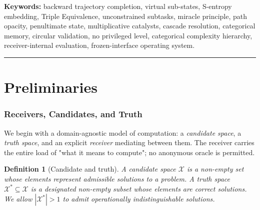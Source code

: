 \documentclass[twocolumn,a4paper]{article}
\newtheorem{definition}[theorem]{Definition}
\newcommand{\Cands}{\mathcal{X}}
\newcommand{\Truth}{\mathcal{X}^{*}}
\begin{document}
\begin{abstract}
closed-form mathematical specification, each forced by a separate theorem and not by design choice. The full architecture admits a frozen-interface contract under which the central abstractions (a vaHera AST, a Resolver trait, a Provider trait, an Operation registry) satisfy stability invariants derivable from the no-privileged-level structure. The mathematical content is presented as pure computer science: every claim is proven, every construction is finite, every algorithm has a complexity proof, every theorem has a numerical validation. A complete validation suite of fourteen experiments, each persisted as a JSON record, verifies the principal theorems with maximum identity-discrepancy below $10^{-10}$ and predicted scaling laws confirmed across grids spanning four orders of magnitude in problem size.
\end{abstract}

\noindent\textbf{Keywords:} backward trajectory completion, virtual sub-states, S-entropy embedding, Triple Equivalence, unconstrained subtasks, miracle principle, path opacity, penultimate state, multiplicative catalysts, cascade resolution, categorical memory, circular validation, no privileged level, categorical complexity hierarchy, receiver-internal evaluation, frozen-interface operating system.

\tableofcontents

\vspace{6pt}
\hrule
\vspace{6pt}

\part{Preliminaries}

\section{Receivers, Candidates, and Truth}
\label{sec:receivers}

We begin with a domain-agnostic model of computation: a \emph{candidate space}, a \emph{truth space}, and an explicit \emph{receiver} mediating between them. The receiver carries the entire load of "what it means to compute"; no anonymous oracle is permitted.

\begin{definition}[Candidate and truth]
\label{def:cand-truth}
A \emph{candidate space} $\Cands$ is a non-empty set whose elements represent admissible solutions to a problem. A \emph{truth space} $\Truth\subseteq\Cands$ is a designated non-empty subset whose elements are correct solutions. We allow $|\Truth|>1$ to admit operationally indistinguishable solutions.
\end{definition}
\end{document}
